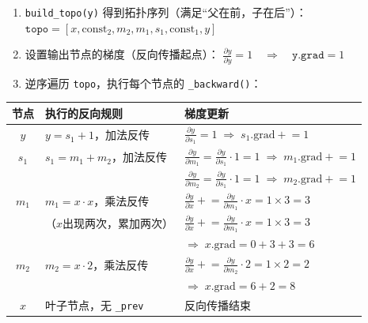 \begin{enumerate}
    \item \texttt{build\_topo(y)} 得到拓扑序列（满足``父在前，子在后''）：
$    \texttt{topo} = [x, \text{const}_2, m_2, m_1, s_1, \text{const}_1, y]$
    
    \item 设置输出节点的梯度（反向传播起点）：
$    \frac{\partial y}{\partial y} = 1 \quad \Rightarrow \quad \texttt{y.grad} = 1
$    
    
    \item 逆序遍历 \texttt{topo}，执行每个节点的 \texttt{\_backward()}：
\end{enumerate}

\begin{center}
\renewcommand{\arraystretch}{1.6}
\begin{tabular}{c|l|l}
\toprule
\textbf{节点} & \textbf{执行的反向规则} & \textbf{梯度更新} \\
\midrule
$y$ & $y = s_1 + 1$，加法反传 & $\displaystyle \frac{\partial y}{\partial s_1} = 1 \;\Rightarrow\; s_1.\text{grad} \mathrel{+}= 1$ \\[3pt]
\midrule
$s_1$ & $s_1 = m_1 + m_2$，加法反传 & $\displaystyle \frac{\partial y}{\partial m_1} = \frac{\partial y}{\partial s_1} \cdot 1 = 1 \;\Rightarrow\; m_1.\text{grad} \mathrel{+}= 1$ \\
 & & $\displaystyle \frac{\partial y}{\partial m_2} = \frac{\partial y}{\partial s_1} \cdot 1 = 1 \;\Rightarrow\; m_2.\text{grad} \mathrel{+}= 1$ \\[3pt]
\midrule
$m_1$ & $m_1 = x \cdot x$，乘法反传 & $\displaystyle \frac{\partial y}{\partial x} \mathrel{+}= \frac{\partial y}{\partial m_1} \cdot x = 1 \times 3 = 3$ \\
 & （$x$出现两次，累加两次） & $\displaystyle \frac{\partial y}{\partial x} \mathrel{+}= \frac{\partial y}{\partial m_1} \cdot x = 1 \times 3 = 3$ \\
 & & $\Rightarrow\; x.\text{grad} = 0 + 3 + 3 = 6$ \\[3pt]
\midrule
$m_2$ & $m_2 = x \cdot 2$，乘法反传 & $\displaystyle \frac{\partial y}{\partial x} \mathrel{+}= \frac{\partial y}{\partial m_2} \cdot 2 = 1 \times 2 = 2$ \\
 & & $\Rightarrow\; x.\text{grad} = 6 + 2 = 8$ \\[3pt]
\midrule
$x$ & 叶子节点，无 \texttt{\_prev} & 反向传播结束 \\
\bottomrule
\end{tabular}
\end{center}

